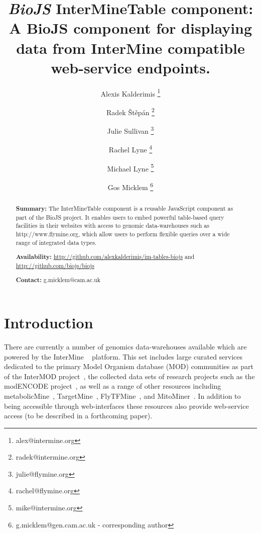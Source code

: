 \documentclass[10pt,a4paper,twocolumn]{article}
\begin{document}
\title{\textit{BioJS} InterMineTable component:
A BioJS component for displaying data from InterMine compatible web-service endpoints.
}

\author[1]{Alexis Kalderimis \thanks{alex@intermine.org}}
\author[1]{Radek Štěpán \thanks{radek@intermine.org}}
\author[1]{Julie Sullivan \thanks{julie@flymine.org}}
\author[1]{Rachel Lyne \thanks{rachel@flymine.org}}
\author[1]{Michael Lyne \thanks{mike@intermine.org}}
\author[1]{Gos Micklem \thanks{g.micklem@gen.cam.ac.uk - corresponding author}}

\maketitle
\thispagestyle{fancy}

\begin{abstract}

\textbf{Summary:}
The InterMineTable component is a reusable JavaScript
component as part of the BioJS project. It enables users to embed
powerful table-based query facilities in their websites with
access to genomic data-warehouses such as http://www.flymine.org,
which allow users to perform flexible queries over a wide range
of integrated data types.

\textbf{Availability:}
\url{http://github.com/alexkalderimis/im-tables-biojs} and
\url{http://github.com/biojs/biojs}

\textbf{Contact:} g.micklem@cam.ac.uk

\end{abstract}
\clearpage

\section*{Introduction}

There are currently a number of genomics data-warehouses available which are
powered by the InterMine ~\cite{smith2012} platform. This set includes large
curated services dedicated to the primary Model Organism database (MOD)
communities as part of the InterMOD project~\cite{sullivan2013}, the collected
data sets of research projects such as the modENCODE
project~\cite{contrino2012}, as well as a range of other resources including
metabolicMine~\cite{metabolicmine}, TargetMine~\cite{targetmine},
FlyTFMine~\cite{flytfmine}, and MitoMiner~\cite{mitominer}.  In addition to
being accessible through web-interfaces these resources also provide web-service
access (to be described in a forthcoming paper).
\end{document}
